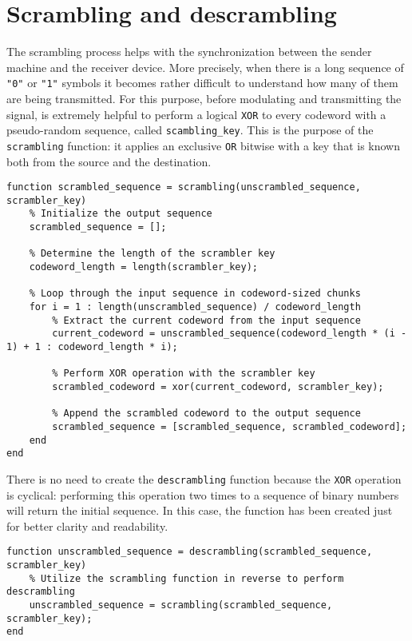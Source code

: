 \vspace{40px} \section{Scrambling and descrambling}
The scrambling process helps with the synchronization between the sender machine and the receiver device. More precisely, when there is a long sequence of \texttt{"0"} or \texttt{"1"} symbols it becomes rather difficult to understand how many of them are being transmitted. \label{scrambling} For this purpose, before modulating and transmitting the signal, is extremely helpful to perform a logical \texttt{XOR} to every codeword with a pseudo-random sequence, called \texttt{scambling\_key}. This is the purpose of the \texttt{scrambling} function: it applies an exclusive \texttt{OR} bitwise with a key that is known both from the source and the destination.

\begin{lstlisting}
function scrambled_sequence = scrambling(unscrambled_sequence, scrambler_key)
    % Initialize the output sequence
    scrambled_sequence = [];

    % Determine the length of the scrambler key
    codeword_length = length(scrambler_key);

    % Loop through the input sequence in codeword-sized chunks
    for i = 1 : length(unscrambled_sequence) / codeword_length
        % Extract the current codeword from the input sequence
        current_codeword = unscrambled_sequence(codeword_length * (i - 1) + 1 : codeword_length * i);
        
        % Perform XOR operation with the scrambler key
        scrambled_codeword = xor(current_codeword, scrambler_key);

        % Append the scrambled codeword to the output sequence
        scrambled_sequence = [scrambled_sequence, scrambled_codeword];
    end
end
\end{lstlisting}

\label{descrambling}\noindent There is no need to create the \texttt{descrambling} function because the \texttt{XOR} operation is cyclical: performing this operation two times to a sequence of binary numbers will return the initial sequence. In this case, the function has been created just for better clarity and readability.

\begin{lstlisting}
function unscrambled_sequence = descrambling(scrambled_sequence, scrambler_key)
    % Utilize the scrambling function in reverse to perform descrambling
    unscrambled_sequence = scrambling(scrambled_sequence, scrambler_key);
end
\end{lstlisting}

